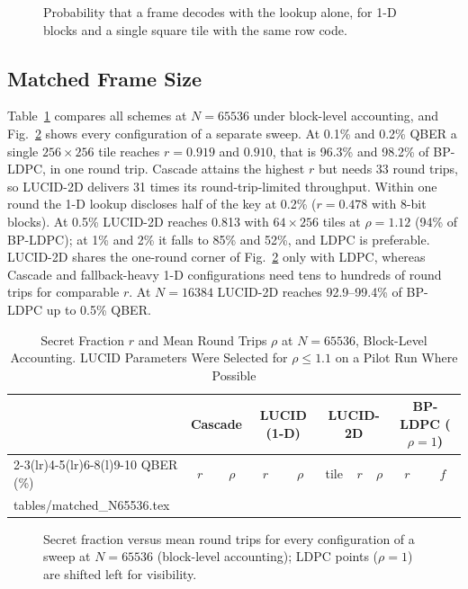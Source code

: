 \documentclass[conference]{IEEEtran}
\makeatletter
\newcommand{\tablerows}[1]{\@@input #1 }
\makeatother
\begin{document}
\begin{figure}[t]
\centering
\caption{Probability that a frame decodes with the lookup alone, for 1-D blocks and a single square tile with the same row code.}
\label{fig:success}
\end{figure}

\subsection{Matched Frame Size}
Table~\ref{tab:matched} compares all schemes at $N=65536$ under block-level accounting, and Fig.~\ref{fig:pareto} shows every configuration of a separate sweep. At 0.1\% and 0.2\% QBER a single $256\times256$ tile reaches $r=0.919$ and $0.910$, that is 96.3\% and 98.2\% of BP-LDPC, in one round trip. Cascade attains the highest $r$ but needs 33 round trips, so LUCID-2D delivers 31 times its round-trip-limited throughput. Within one round the 1-D lookup discloses half of the key at 0.2\% ($r=0.478$ with 8-bit blocks). At 0.5\% LUCID-2D reaches 0.813 with $64\times256$ tiles at $\rho=1.12$ (94\% of BP-LDPC); at 1\% and 2\% it falls to 85\% and 52\%, and LDPC is preferable. LUCID-2D shares the one-round corner of Fig.~\ref{fig:pareto} only with LDPC, whereas Cascade and fallback-heavy 1-D configurations need tens to hundreds of round trips for comparable $r$. At $N=16384$ LUCID-2D reaches 92.9--99.4\% of BP-LDPC up to 0.5\% QBER.

\begin{table}[t]
\caption{Secret Fraction $r$ and Mean Round Trips $\rho$ at $N=65536$, Block-Level Accounting. LUCID Parameters Were Selected for $\rho\le1.1$ on a Pilot Run Where Possible}
\label{tab:matched}
\centering
\begin{tabular}{@{}lccccccccc@{}}
\toprule
& \multicolumn{2}{c}{Cascade} & \multicolumn{2}{c}{LUCID (1-D)} & \multicolumn{3}{c}{LUCID-2D} & \multicolumn{2}{c}{BP-LDPC ($\rho=1$)}\\
\cmidrule(lr){2-3}\cmidrule(lr){4-5}\cmidrule(lr){6-8}\cmidrule(l){9-10}
QBER (\%) & $r$ & $\rho$ & $r$ & $\rho$ & tile & $r$ & $\rho$ & $r$ & $f$\\
\midrule
\tablerows{tables/matched_N65536.tex}
\bottomrule
\end{tabular}
\end{table}

\begin{figure}[t]
\centering
\caption{Secret fraction versus mean round trips for every configuration of a sweep at $N=65536$ (block-level accounting); LDPC points ($\rho=1$) are shifted left for visibility.}
\label{fig:pareto}
\end{figure}
\end{document}
